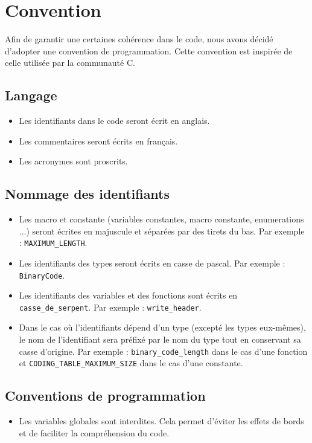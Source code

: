 \section{Convention}

Afin de garantir une certaines cohérence dans le code, nous avons décidé d'adopter une convention de programmation.
Cette convention est inspirée de celle utilisée par la communauté C.

\subsection{Langage}

\begin{itemize}
    \item Les identifiants dans le code seront écrit en anglais.
    \item Les commentaires seront écrits en français.
    \item Les acronymes sont proscrits.
\end{itemize}

\subsection{Nommage des identifiants}

\begin{itemize}
    \item Les macro et constante (variables constantes, macro constante, enumerations ...) seront écrites en majuscule et séparées par des tirets du bas. Par exemple : \texttt{MAXIMUM\_LENGTH}.
    \item Les identifiants des types seront écrits en casse de pascal. Par exemple : \texttt{BinaryCode}.
    \item Les identifiants des variables et des fonctions sont écrits en \texttt{casse\_de\_serpent}. Par exemple : \texttt{write\_header}.
    \item Dans le cas où l'identifiants dépend d'un type (excepté les types eux-mêmes), le nom de l'identifiant sera préfixé par le nom du type tout en conservant sa casse d'origine.
    Par exemple : \texttt{binary\_code\_length} dans le cas d'une fonction et \texttt{CODING\_TABLE\_MAXIMUM\_SIZE} dans le cas d'une constante.
\end{itemize}

\subsection{Conventions de programmation}

\begin{itemize}
    \item Les variables globales sont interdites. Cela permet d'éviter les effets de bords et de faciliter la compréhension du code.
\end{itemize}